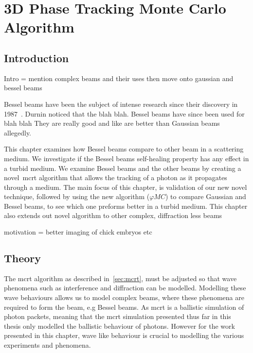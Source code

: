 \chapter{3D Phase Tracking Monte Carlo Algorithm}\label{sec:phase}

\section{Introduction}\label{sec:besintro}

Intro = mention complex beams and their uses then move onto gaussian and bessel beams

Bessel beams have been the subject of intense research since their discovery in 1987~\cite{durnin1987diffraction,durnin1987exact}. Durnin noticed that the blah blah.
Bessel beams have since been used for blah blah
They are really good and like are better than Gaussian beams allegedly.

This chapter examines how Bessel beams compare to other beam in a scattering medium. 
We investigate if the Bessel beams self-healing property has any effect in a turbid medium.
We examine Bessel beams and the other beams by creating a novel~\gls{mcrt} algorithm that allows the tracking of a photon as it propagates through a medium. 
The main focus of this chapter, is validation of our new novel technique, followed by using the new algorithm ($\varphi MC$) to compare Gaussian and Bessel beams, to see which one preforms better in a turbid medium. 
This chapter also extends out novel algorithm to other complex, diffraction less beams


motivation = better imaging of chick embryos etc


\section{Theory}\label{sec:bestheory}

The \gls{mcrt} algorithm as described in~\cref{sec:mcrt}, must be adjusted so that wave phenomena such as interference and diffraction can be modelled. 
Modelling these wave behaviours allows us to model complex beams, where these phenomena are required to form the beam, e.g Bessel beams. 
As \gls{mcrt} is a ballistic simulation of photon packets, meaning that the \gls{mcrt} simulation presented thus far in this thesis only modelled the ballistic behaviour of photons. 
However for the work presented in this chapter, wave like behaviour is crucial to modelling the various experiments and phenomena.

